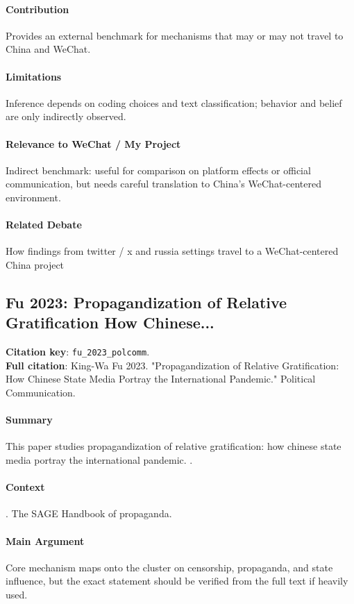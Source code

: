 \documentclass[12pt]{article}
\begin{document}
\paragraph{Contribution} Provides an external benchmark for mechanisms that may or may not travel to China and WeChat.

\paragraph{Limitations} Inference depends on coding choices and text classification; behavior and belief are only indirectly observed.

\paragraph{Relevance to WeChat / My Project} Indirect benchmark: useful for comparison on platform effects or official communication, but needs careful translation to China's WeChat-centered environment.

\paragraph{Related Debate} How findings from twitter / x and russia settings travel to a WeChat-centered China project


\subsection{Fu 2023: Propagandization of Relative Gratification How Chinese...}
\textbf{Citation key}: \texttt{fu\_2023\_polcomm}.\\
\textbf{Full citation}: King-Wa Fu 2023. "Propagandization of Relative Gratification: How Chinese State Media Portray the International Pandemic." Political Communication.

\paragraph{Summary} This paper studies propagandization of relative gratification: how chinese state media portray the international pandemic. .

\paragraph{Context} . The SAGE Handbook of propaganda.

\paragraph{Main Argument} Core mechanism maps onto the cluster on censorship, propaganda, and state influence, but the exact statement should be verified from the full text if heavily used.
\end{document}
